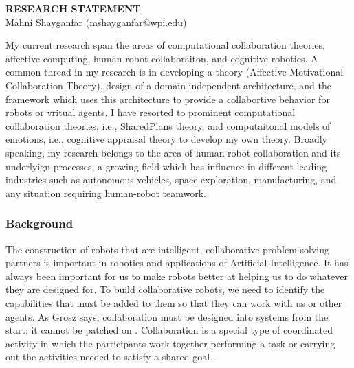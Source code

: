 \documentclass[a4paper, 10pt]{article}
\begin{document}
\thispagestyle{fancy}

\lhead{}
\rhead{}

\renewcommand{\headrulewidth}{0pt} 
\renewcommand{\footrulewidth}{0pt} 

\pagestyle{fancy}

\rhead{\textcolor{gray}{\thepage/\totalpages{}}}

\begin{small}

\begin{center}
{\LARGE \bf RESEARCH STATEMENT}\\
\vspace*{0.1cm}
{\normalsize Mahni Shayganfar (mshayganfar@wpi.edu)}
\end{center}

My current research span the areas of computational collaboration theories,
affective computing, human-robot collaboraiton, and cognitive robotics. A
common thread in my research is in developing a theory (Affective Motivational
Collaboration Theory), design of a domain-independent architecture, and the
framework which uses this architecture to provide a collabortive behavior for
robots or vritual agents. I have resorted to prominent computational
collaboration theories, i.e., SharedPlans theory, and computaitonal models of
emotions, i.e., cognitive appraisal theory to develop my own theory. Broadly
speaking, my research belongs to the area of human-robot collaboration and its
underlyign processes, a growing field which has influence in different leading
industries such as autonomous vehicles, space exploration, manufacturing, and
any situation requiring human-robot teamwork.

\subsubsection*{Background}

The construction of robots that are intelligent, collaborative problem-solving
partners is important in robotics and applications of Artificial Intelligence.
It has always been important for us to make robots better at helping us to do
whatever they are designed for. To build collaborative robots, we need to
identify the capabilities that must be added to them so that they can work with
us or other agents. As Grosz says, collaboration must be designed into systems
from the start; it cannot be patched on \cite{grosz:collaborative-systems}.
Collaboration is a special type of coordinated activity in which the
participants work together performing a task or carrying out the activities
needed to satisfy a shared goal \cite{grosz:collaboration}. 


\end{small}
\end{document}
